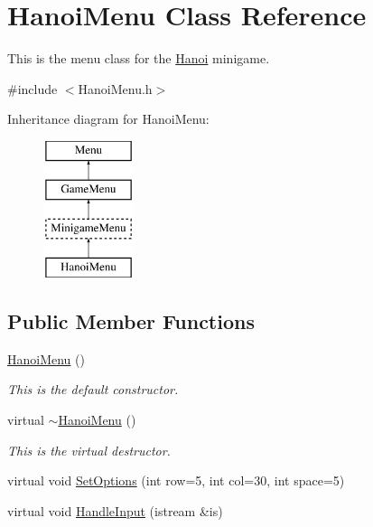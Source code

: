 \hypertarget{classHanoiMenu}{\section{Hanoi\-Menu Class Reference}
\label{classHanoiMenu}
}


This is the menu class for the \hyperlink{classHanoi}{Hanoi} minigame.  




{\ttfamily \#include $<$Hanoi\-Menu.\-h$>$}

Inheritance diagram for Hanoi\-Menu\-:\begin{figure}[H]
\begin{center}
\leavevmode
\includegraphics[height=4.000000cm]{classHanoiMenu}
\end{center}
\end{figure}
\subsection*{Public Member Functions}
\begin{DoxyCompactItemize}
\item 
\hypertarget{classHanoiMenu_a77aa5dc29b4c2954983e0471b8421d57}{\hyperlink{classHanoiMenu_a77aa5dc29b4c2954983e0471b8421d57}{Hanoi\-Menu} ()}\label{classHanoiMenu_a77aa5dc29b4c2954983e0471b8421d57}

\begin{DoxyCompactList}\small\item\em This is the default constructor. \end{DoxyCompactList}\item 
\hypertarget{classHanoiMenu_a8c69e463f6d6cd406cfed43a8d29bc2e}{virtual \hyperlink{classHanoiMenu_a8c69e463f6d6cd406cfed43a8d29bc2e}{$\sim$\-Hanoi\-Menu} ()}\label{classHanoiMenu_a8c69e463f6d6cd406cfed43a8d29bc2e}

\begin{DoxyCompactList}\small\item\em This is the virtual destructor. \end{DoxyCompactList}\item 
virtual void \hyperlink{classHanoiMenu_a0280d0e443642407fda5903346be1a39}{Set\-Options} (int row=5, int col=30, int space=5)
\item 
virtual void \hyperlink{classHanoiMenu_a8f85bae3166bf122c5800aab41c87d54}{Handle\-Input} (istream \&is)
\end{DoxyCompactItemize}
